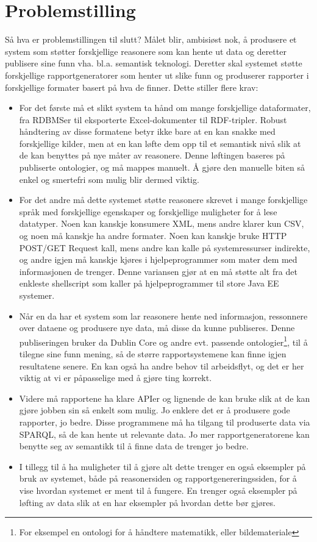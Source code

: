 \documentclass[11pt]{article}
\begin{document}
\section{Problemstilling}
Så hva er problemstillingen til slutt?
Målet blir, ambisiøst nok, å produsere et system som støtter forskjellige reasonere som kan hente ut data og deretter publisere sine funn vha. bl.a. semantisk teknologi. Deretter skal systemet støtte forskjellige rapportgeneratorer som henter ut slike funn og produserer rapporter i forskjellige formater basert på hva de finner.
Dette stiller flere krav:
\begin{itemize}
\item For det første må et slikt system ta hånd om mange forskjellige dataformater, fra RDBMSer til eksporterte Excel-dokumenter til RDF-tripler.
  Robust håndtering av disse formatene betyr ikke bare at en kan snakke med forskjellige kilder, men at en kan løfte dem opp til et semantisk nivå slik at de kan benyttes på nye måter av reasonere. Denne løftingen baseres på publiserte ontologier, og må mappes manuelt. Å gjøre den manuelle biten så enkel og smertefri som mulig blir dermed viktig.
\item For det andre må dette systemet støtte reasonere skrevet i mange forskjellige språk med forskjellige egenskaper og forskjellige muligheter for å lese datatyper. Noen kan kanskje konsumere XML, mens andre klarer kun CSV, og noen må kanskje ha andre formater. Noen kan kanskje bruke HTTP POST/GET Request kall, mens andre kan kalle på systemressurser indirekte, og andre igjen må kanskje kjøres i hjelpeprogrammer som mater dem med informasjonen de trenger. Denne variansen gjør at en må støtte alt fra det enkleste shellscript som kaller på hjelpeprogrammer til store Java EE systemer.
\item Når en da har et system som lar reasonere hente ned informasjon, ressonnere over dataene og produsere nye data, må disse da kunne publiseres. Denne publiseringen bruker da Dublin Core og andre evt. passende ontologier\footnote{For eksempel en ontologi for å håndtere matematikk, eller bildemateriale}, til å tilegne sine funn mening, så de større rapportsystemene kan finne igjen resultatene senere. En kan også ha andre behov til arbeidsflyt, og det er her viktig at vi er påpasselige med å gjøre ting korrekt.
\item Videre må rapportene ha klare APIer og lignende de kan bruke slik at de kan gjøre jobben sin så enkelt som mulig. Jo enklere det er å produsere gode rapporter, jo bedre. Disse programmene må ha tilgang til produserte data via SPARQL, så de kan hente ut relevante data. Jo mer rapportgeneratorene kan benytte seg av semantikk til å finne data de trenger jo bedre.
\item I tillegg til å ha muligheter til å gjøre alt dette trenger en også eksempler på bruk av systemet, både på reasonersiden og rapportgenereringssiden, for å vise hvordan systemet er ment til å fungere. En trenger også eksempler på løfting av data slik at en har eksempler på hvordan dette bør gjøres.
\end{itemize}
\end{document}
